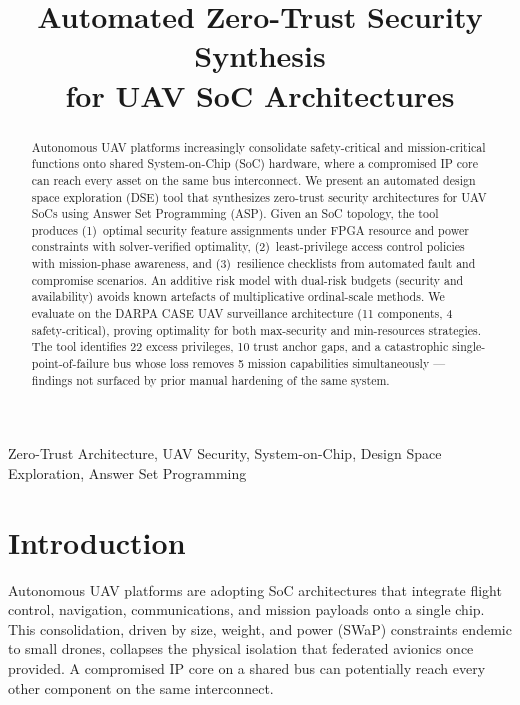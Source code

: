 \documentclass[conference]{IEEEtran}
\begin{document}
\title{Automated Zero-Trust Security Synthesis\\
for UAV SoC Architectures}

\author{}

\maketitle

\begin{abstract}
Autonomous UAV platforms increasingly consolidate safety-critical and
mission-critical functions onto shared System-on-Chip (SoC) hardware,
where a compromised IP core can reach every asset on the same bus
interconnect. We present an automated design space exploration (DSE)
tool that synthesizes zero-trust security architectures for UAV SoCs
using Answer Set Programming (ASP). Given an SoC topology, the tool
produces (1)~optimal security feature assignments under FPGA resource
and power constraints with solver-verified optimality, (2)~least-privilege
access control policies with mission-phase awareness, and
(3)~resilience checklists from automated fault and compromise scenarios.
An additive risk model with dual-risk budgets (security and availability)
avoids known artefacts of multiplicative ordinal-scale methods.
We evaluate on the DARPA CASE UAV surveillance architecture (11
components, 4 safety-critical), proving optimality for both max-security
and min-resources strategies. The tool identifies 22 excess privileges,
10 trust anchor gaps, and a catastrophic single-point-of-failure bus
whose loss removes 5 mission capabilities simultaneously --- findings
not surfaced by prior manual hardening of the same system.
\end{abstract}

\begin{IEEEkeywords}
Zero-Trust Architecture, UAV Security, System-on-Chip, Design Space
Exploration, Answer Set Programming
\end{IEEEkeywords}

\section{Introduction}

Autonomous UAV platforms are adopting SoC architectures that integrate
flight control, navigation, communications, and mission payloads onto a
single chip. This consolidation, driven by size, weight, and power (SWaP)
constraints endemic to small drones, collapses the physical isolation
that federated avionics once provided. A compromised IP core on a
shared bus can potentially reach every other component on the same
interconnect.
\end{document}
